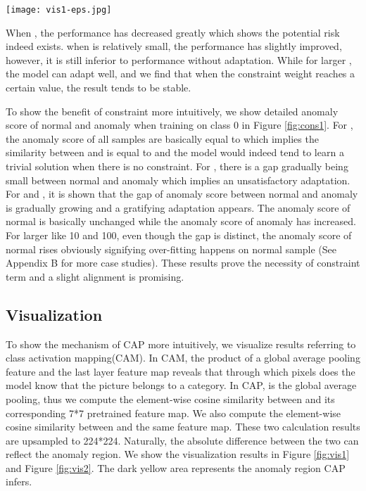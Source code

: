\documentclass{article}
\begin{document}
\begin{figure*}[t]
	\centering
	\texttt{[image: vis1-eps.jpg]}
	\caption{Visualization of CIFAR-10 (Semantic AD). The inferred anomaly region of normal image is in the inessential area and that of anomaly image is on the semantic target.}
	\label{fig:vis1}
\end{figure*}


When , the performance has decreased greatly which shows the potential risk indeed exists. when  is relatively small, the performance has slightly improved, however, it is still inferior to performance without adaptation. While for larger , the model can adapt well, and we find that when the constraint weight reaches a certain value, the result tends to be stable.

To show the benefit of constraint more intuitively, we show detailed anomaly score of normal and anomaly when training on class 0 in Figure \ref{fig:cons1}. For , the anomaly score of all samples are basically equal to  which implies the similarity between  and  is equal to  and the model would indeed tend to learn a trivial solution when there is no constraint. For , there is a gap gradually being small between normal and anomaly which implies an unsatisfactory adaptation. For  and , it is shown that the gap of anomaly score between normal and anomaly is gradually growing and a gratifying adaptation appears. The anomaly score of normal is basically unchanged while the anomaly score of anomaly has increased. For larger  like 10 and 100, even though the gap is distinct, the anomaly score of normal rises obviously signifying over-fitting happens on normal sample (See Appendix B for more case studies). These results prove the necessity of constraint term and a slight alignment is promising.
 


\subsection{Visualization}

To show the mechanism of CAP more intuitively, we visualize results referring to class activation mapping(CAM)\cite{zhou2016learning}. In CAM, the product of a global average pooling feature  and the last layer feature map  reveals that through which pixels does the model know that the picture belongs to a category. In CAP,  is the global average pooling, thus we compute the element-wise cosine similarity between   and its corresponding 7*7 pretrained feature map. We also compute the element-wise cosine similarity between  and the same feature map. These two calculation results are upsampled to 224*224. Naturally, the absolute difference between the two can reflect the anomaly region. We show the visualization results in Figure \ref{fig:vis1} and Figure \ref{fig:vis2}. The dark yellow area represents the anomaly region CAP infers.
\end{document}

